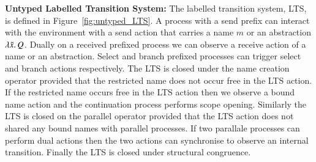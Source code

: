 

{\bf Untyped Labelled Transition System:}
The labelled transition system, LTS, is defined in Figure~\ref{fig:untyped_LTS}.
A process with a send prefix can interact with the environment with a send
action that carries a name $m$ or an abstraction $\lambda \tilde{x}.\,Q$. Dually
on a received prefixed process we can observe a receive action of a name or
an abstraction. Select and branch prefixed processes can trigger select
and branch actions respectively. The LTS is closed under the name creation
operator provided that the restricted name does not occur free in the LTS action.
If the restricted name occurs free in the LTS action then we observe a bound name
action and the continuation process performs scope opening. Similarly the LTS 
is closed on the parallel operator provided that the LTS action does not shared
any bound names with parallel processes. If two parallale processes can perform
dual actions then the two actions can synchronise to observe an internal transition.
Finally the LTS is closed under structural congruence.

